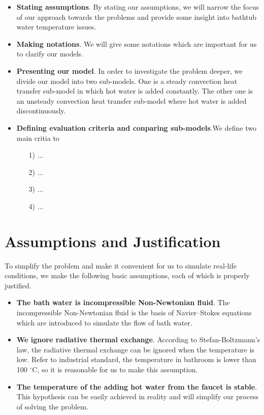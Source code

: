 \documentclass{mcmthesis}
\begin{document}
\begin{itemize}     %
\item {\bf Stating assumptions}. By stating our assumptions, we will narrow the 
focus of our approach towards the problems and provide some insight into bathtub 
water temperature issues.
    
\item {\bf Making notations}. We will give some notations which are important for 
us to clarify our models.
    
\item {\bf Presenting our model}. In order to investigate the problem deeper, we 
divide our model into two sub-models. One is a steady convection heat transfer 
sub-model in which hot water is added constantly. The other one is an unsteady 
convection heat transfer sub-model where hot water is added discontinuously.

\item{\bf Defining evaluation criteria and conparing sub-models}.We define two 
main critia to 

\begin{itemize}
\item[1)] ... 
\item[2)] ...
\item[3)] ...
\item[4)] ...
\end{itemize}
    
\end{itemize}

\section{Assumptions and Justification}
To simplify the problem and make it convenient for us to simulate real-life 
conditions, we make the following basic assumptions, each of which is properly 
justified.

\begin{itemize}
\item {\bf The bath water is incompressible Non-Newtonian fluid}. The 
incompressible Non-Newtonian fluid is the basis of Navier–Stokes equations 
which are introduced to simulate the flow of bath water.
    
\item {\bf We ignore radiative thermal exchange}. According to Stefan-Boltzmann’s 
law, the radiative thermal exchange can be ignored when the temperature is low. 
Refer to industrial standard, the temperature in bathroom is lower than 
100 $^{\circ}$C, so it is reasonable for us to make this assumption.
    
\item {\bf The temperature of the adding hot water from the faucet is stable}. 
This hypothesis can be easily achieved in reality and will simplify our process 
of solving the problem.
\end{itemize}
\end{document}
